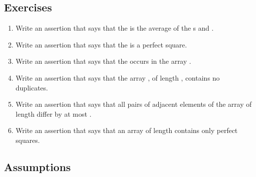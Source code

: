 %

\subsection*{Exercises}
\begin{enumerate}
\item Write an assertion that says that the   is the average of
  the s  and .
\item Write an assertion that says that the   is a
  perfect square.
\item Write an assertion that says that the   occurs
  in the  array .
\item Write an assertion that says that the  array ,
  of length , contains no duplicates.
\item Write an assertion that says that all pairs of adjacent elements
  of the  array  of length  differ by at most
  .
\item Write an assertion that says that an array  of length
   contains only perfect squares.
\end{enumerate}

\subsection{Assumptions}

